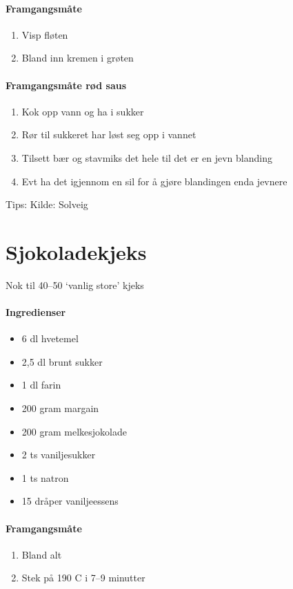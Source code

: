 \documentclass[12pt,a4paper]{book}
\begin{document}
\paragraph{Framgangsmåte}
\begin{enumerate}[noitemsep]
	\item Visp fløten
	\item Bland inn kremen i grøten
\end{enumerate}

\paragraph{Framgangsmåte rød saus}
\begin{enumerate}[noitemsep]
	\item Kok opp vann og ha i sukker
	\item Rør til sukkeret har løst seg opp i vannet
	\item Tilsett bær og stavmiks det hele til det er en jevn blanding
	\item Evt ha det igjennom en sil for å gjøre blandingen enda jevnere
\end{enumerate}




Tips:
Kilde: Solveig
\clearpage{}
\clearpage{}\section{﻿Sjokoladekjeks}
Nok til 40--50 `vanlig store' kjeks

\paragraph{Ingredienser}
\begin{itemize}[noitemsep]
	\item 6 dl hvetemel
	\item 2,5 dl brunt sukker
	\item 1 dl farin
	\item 200 gram margain
	\item 200 gram melkesjokolade
	\item 2 ts vaniljesukker
	\item 1 ts natron
	\item 15 dråper vaniljeessens
\end{itemize}

\paragraph{Framgangsmåte}
\begin{enumerate}[noitemsep]
	\item Bland alt
	\item Stek på 190 \degree C i 7--9 minutter
\end{enumerate}
\end{document}

